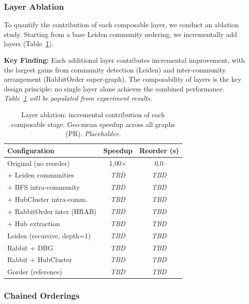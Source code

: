 \documentclass[sigconf, nonacm]{acmart}
\begin{document}
\subsubsection{Layer Ablation}
\label{sec:ablation}

To quantify the contribution of each composable layer, we conduct an ablation study. Starting from a base Leiden community ordering, we incrementally add layers (Table~\ref{table:ablation}).

\textbf{Key Finding:} Each additional layer contributes incremental improvement, with the largest gains from community detection (Leiden) and inter-community arrangement (RabbitOrder super-graph). The composability of layers is the key design principle: no single layer alone achieves the combined performance. \emph{Table~\ref{table:ablation} will be populated from experiment results.}

\begin{table}[t]
\centering
\caption{Layer ablation: incremental contribution of each composable stage. Geo-mean speedup across all graphs (PR). \emph{Placeholder.}}
\footnotesize
\begin{tabular}{@{}lcc@{}}
\toprule
\textbf{Configuration} & \textbf{Speedup} & \textbf{Reorder (s)} \\
\midrule
Original (no reorder)     & 1.00$\times$ & 0.0 \\
+ Leiden communities       & \emph{TBD}   & \emph{TBD} \\
+ BFS intra-community      & \emph{TBD}   & \emph{TBD} \\
+ HubCluster intra-comm.   & \emph{TBD}   & \emph{TBD} \\
+ RabbitOrder inter (HRAB) & \emph{TBD}   & \emph{TBD} \\
+ Hub extraction           & \emph{TBD}   & \emph{TBD} \\
Leiden (recursive, depth=1) & \emph{TBD}   & \emph{TBD} \\
Rabbit + DBG               & \emph{TBD}   & \emph{TBD} \\
Rabbit + HubCluster        & \emph{TBD}   & \emph{TBD} \\
Gorder (reference)         & \emph{TBD}   & \emph{TBD} \\
\bottomrule
\end{tabular}
\label{table:ablation}
\end{table}

\subsubsection{Chained Orderings}
\label{sec:chained_eval}
\end{document}
